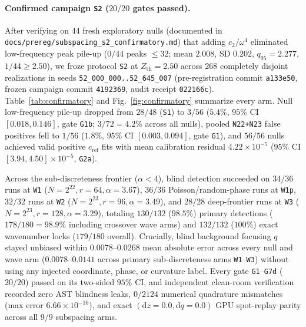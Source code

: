 \documentclass[11pt,a4paper]{article}
\begin{document}
\paragraph{Confirmed campaign \texttt{S2} ($20/20$ gates passed).}
After verifying on $44$ fresh exploratory nulls (documented in
\nolinkurl{docs/prereg/subspacing_s2_confirmatory.md})
that adding $c_2/\omega^4$ eliminated low-frequency peak pile-up ($0/44$ peaks $\le 32$;
mean $2.008$, SD $0.202$, $q_{95} = 2.277$, $1/44 \ge 2.50$), we froze protocol
\texttt{S2} at $Z_{\text{th}} = 2.50$ across $268$ completely disjoint realizations in
seeds \texttt{52\_000\_000..52\_645\_007} (pre-registration commit \texttt{a133e50}, frozen campaign commit
\texttt{4192369}, audit receipt \texttt{022166c}). Table~\ref{tab:confirmatory} and Fig.~\ref{fig:confirmatory}
summarize every arm. Null low-frequency pile-up dropped from $28/48$ (\texttt{S1}) to
$3/56$ ($5.4\%$, $95\%$ CI $[0.018, 0.146]$, gate \texttt{G1b}; $3/72 = 4.2\%$ across all
nulls), pooled \texttt{N22+N23} false positives fell to $1/56$ ($1.8\%$, $95\%$ CI $[0.003, 0.094]$,
gate \texttt{G1}), and $56/56$ nulls achieved valid positive $c_{\text{ref}}$ fits with mean
calibration residual $4.22\times 10^{-5}$ ($95\%$ CI $[3.94, 4.50]\times 10^{-5}$, \texttt{G2a}).

Across the sub-discreteness frontier ($\alpha < 4$), blind detection succeeded on $34/36$
runs at \texttt{W1} ($N=2^{22}, r=64, \alpha=3.67$), $36/36$ Poisson/random-phase runs at \texttt{W1p},
$32/32$ runs at \texttt{W2} ($N=2^{23}, r=96, \alpha=3.49$), and $28/28$ deep-frontier runs at
\texttt{W3} ($N=2^{23}, r=128, \alpha=3.29$), totaling $130/132$ ($98.5\%$) primary detections
($178/180 = 98.9\%$ including crossover wave arms) and $132/132$ ($100\%$) exact wavenumber
locks ($179/180$ overall). Crucially, blind background focusing $q$ stayed unbiased within
$0.0078$--$0.0268$ mean absolute error across every null and wave arm ($0.0078$--$0.0141$ across
primary sub-discreteness arms \texttt{W1}--\texttt{W3}) without using any injected
coordinate, phase, or curvature label. Every gate \texttt{G1}--\texttt{G7d} ($20/20$)
passed on its two-sided $95\%$ CI, and independent clean-room verification recorded zero AST
blindness leaks, $0/2124$ numerical quadrature mismatches (max error $6.66\times 10^{-16}$),
and exact $(\text{d}z=0.0, \text{d}q=0.0)$ GPU spot-replay parity across all $9/9$ subspacing arms.
\end{document}
